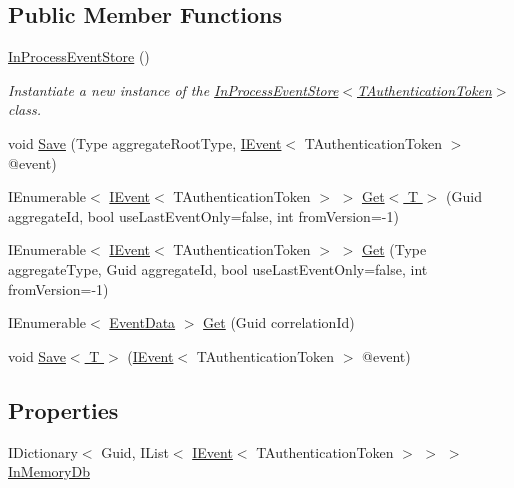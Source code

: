 \subsection*{Public Member Functions}
\begin{DoxyCompactItemize}
\item 
\hyperlink{classCqrs_1_1Events_1_1InProcessEventStore_a81534fc0086e307f46051c26111c47ab_a81534fc0086e307f46051c26111c47ab}{In\+Process\+Event\+Store} ()
\begin{DoxyCompactList}\small\item\em Instantiate a new instance of the \hyperlink{classCqrs_1_1Events_1_1InProcessEventStore_a81534fc0086e307f46051c26111c47ab_a81534fc0086e307f46051c26111c47ab}{In\+Process\+Event\+Store$<$\+T\+Authentication\+Token$>$} class. \end{DoxyCompactList}\item 
void \hyperlink{classCqrs_1_1Events_1_1InProcessEventStore_a93e6d7dc5b81ffba6a89cf22b273d0c9_a93e6d7dc5b81ffba6a89cf22b273d0c9}{Save} (Type aggregate\+Root\+Type, \hyperlink{interfaceCqrs_1_1Events_1_1IEvent}{I\+Event}$<$ T\+Authentication\+Token $>$ @event)
\item 
I\+Enumerable$<$ \hyperlink{interfaceCqrs_1_1Events_1_1IEvent}{I\+Event}$<$ T\+Authentication\+Token $>$ $>$ \hyperlink{classCqrs_1_1Events_1_1InProcessEventStore_a425206c170ac3d000652dfdab181b340_a425206c170ac3d000652dfdab181b340}{Get$<$ T $>$} (Guid aggregate\+Id, bool use\+Last\+Event\+Only=false, int from\+Version=-\/1)
\item 
I\+Enumerable$<$ \hyperlink{interfaceCqrs_1_1Events_1_1IEvent}{I\+Event}$<$ T\+Authentication\+Token $>$ $>$ \hyperlink{classCqrs_1_1Events_1_1InProcessEventStore_ac588cacc020921c5120b290b95c641e7_ac588cacc020921c5120b290b95c641e7}{Get} (Type aggregate\+Type, Guid aggregate\+Id, bool use\+Last\+Event\+Only=false, int from\+Version=-\/1)
\item 
I\+Enumerable$<$ \hyperlink{classCqrs_1_1Events_1_1EventData}{Event\+Data} $>$ \hyperlink{classCqrs_1_1Events_1_1InProcessEventStore_aeff2bd8064eb4a1501d723e2aa9f8cfd_aeff2bd8064eb4a1501d723e2aa9f8cfd}{Get} (Guid correlation\+Id)
\item 
void \hyperlink{classCqrs_1_1Events_1_1InProcessEventStore_ace191a5083a6ddd308dbbc302dc5bd8e_ace191a5083a6ddd308dbbc302dc5bd8e}{Save$<$ T $>$} (\hyperlink{interfaceCqrs_1_1Events_1_1IEvent}{I\+Event}$<$ T\+Authentication\+Token $>$ @event)
\end{DoxyCompactItemize}
\subsection*{Properties}
\begin{DoxyCompactItemize}
\item 
I\+Dictionary$<$ Guid, I\+List$<$ \hyperlink{interfaceCqrs_1_1Events_1_1IEvent}{I\+Event}$<$ T\+Authentication\+Token $>$ $>$ $>$ \hyperlink{classCqrs_1_1Events_1_1InProcessEventStore_a4d0dee81baa7348a2d16fd0878220bd4_a4d0dee81baa7348a2d16fd0878220bd4}{In\+Memory\+Db}
\end{DoxyCompactItemize}


